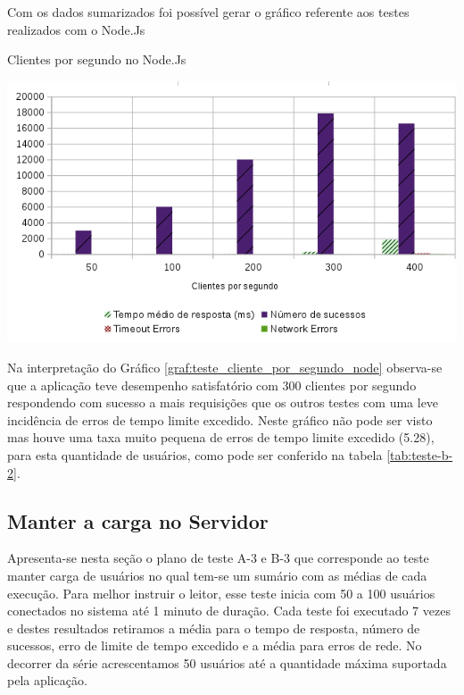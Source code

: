   Com os dados sumarizados foi possível gerar o gráfico referente aos testes realizados com o Node.Js

  \begin{grafico}[H]
    \setlength{\abovecaptionskip}{5pt}
    \setlength{\belowcaptionskip}{0pt}

    \caption[Clientes por segundo no Node.Js]
	    {Clientes por segundo no Node.Js}
    \centering
    \includegraphics[width=.80\textwidth]{imagem/graficos/grafico_node_plano_de_teste_2.png}
    \captionsetup[grafico]{justification=centering}
    \label{graf:teste_cliente_por_segundo_node}
  \end{grafico}

  Na interpretação do Gráfico \ref{graf:teste_cliente_por_segundo_node} observa-se que a aplicação teve desempenho satisfatório
  com 300 clientes por segundo respondendo com sucesso a mais requisições que os outros testes com uma leve incidência de erros de 
  tempo limite excedido. Neste gráfico não pode
  ser visto mas houve uma taxa muito pequena de erros de tempo limite excedido (5.28), para esta quantidade de usuários, como pode ser conferido na tabela
  \ref{tab:teste-b-2}.



\subsection{Manter a carga no Servidor}


  Apresenta-se nesta seção o plano de teste A-3 e B-3 que corresponde ao teste manter carga de usuários no qual tem-se um sumário
  com as médias de cada execução.
  Para melhor instruir o leitor, esse teste inicia com 50 a 100 usuários conectados no sistema até 1 minuto de duração. Cada teste
  foi executado 7 vezes e destes resultados retiramos a média para o tempo de resposta, número de sucessos, erro de limite de tempo excedido
  e a média para erros de rede. No decorrer da série acrescentamos 50 usuários até a quantidade máxima suportada pela aplicação.

